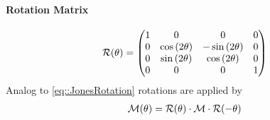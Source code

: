 \paragraph{Rotation Matrix}
\begin{align}
\mathcal{R}(\theta)=
\begin{split}
\begin{pmatrix}
    1 &                0 &               0 & 0 \\
    0 & \cos{(2\theta)} & -\sin{(2\theta)} & 0 \\
    0 & \sin{(2\theta)} & \cos{(2\theta)} & 0 \\
    0 &                0 &               0 & 1
  \end{pmatrix}
\end{split}
\end{align}
%
Analog to \cref{eq::JonesRotation} rotations are applied by
\begin{align}
\mathcal{M}(\theta )=\mathcal{R}(\theta )\cdot\mathcal{M}\cdot\mathcal{R}(-\theta )
\end{align}
%
%
% 
%
